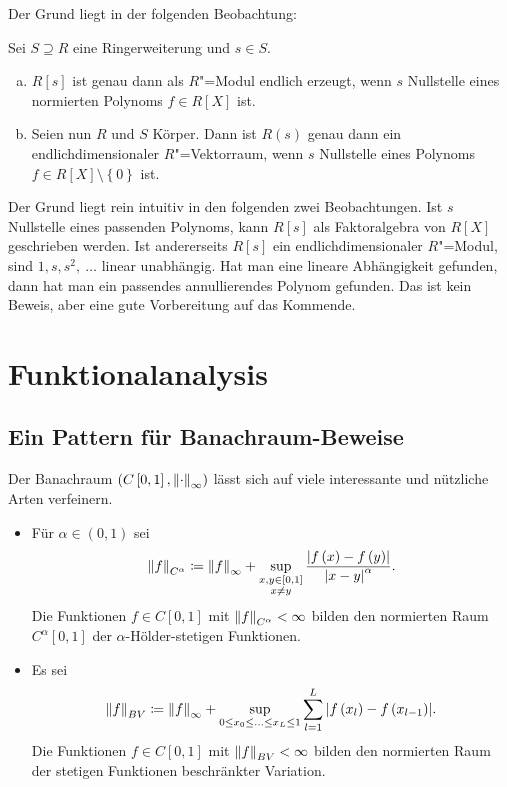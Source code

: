 \documentclass[ngerman, 11pt, a4paper, twoside, abstracton]{scrbook}
\begin{document}
Der Grund liegt in der folgenden Beobachtung:

\begin{pattern}
  Sei $S\supseteq R$ eine Ringerweiterung und $s\in S$.

  \begin{enumerate}[(a)]
    \item $R\left[ s \right]$ ist genau dann als $R$"=Modul endlich erzeugt, wenn $s$ Nullstelle eines normierten Polynoms $f\in R\left[ X \right]$ ist.
    \item Seien nun $R$ und $S$ Körper. Dann ist $R\left( s \right)$ genau dann ein endlichdimensionaler $R$"=Vektorraum, wenn $s$ Nullstelle eines Polynoms $f\in R\left[ X \right]\setminus\left\{ 0 \right\}$ ist.
  \end{enumerate}

\end{pattern}

Der Grund liegt rein intuitiv in den folgenden zwei Beobachtungen. Ist $s$ Nullstelle eines passenden Polynoms, kann $R\left[ s \right]$ als Faktoralgebra von $R\left[ X \right]$ geschrieben werden. Ist andererseits $R\left[ s \right]$ ein endlichdimensionaler $R$"=Modul, sind $1, s, s^2,\ \dots$ linear unabhängig. Hat man eine lineare Abhängigkeit gefunden, dann hat man ein passendes annullierendes Polynom gefunden. Das ist kein Beweis, aber eine gute Vorbereitung auf das Kommende.

\chapter{Funktionalanalysis}

\section{Ein Pattern für Banachraum-Beweise}

\newcommand{\inorm}[1]{\norm{#1}_\infty}

Der Banachraum $\left(C\left[ 0, 1 \right], \inorm{\cdot}\right)$ lässt sich auf viele interessante und nützliche Arten verfeinern.

\begin{itemize}
  \item Für $\alpha\in\left( 0, 1 \right)$ sei
    \[
      \norm{f}_{C^\alpha} \coloneqq \inorm{f} + \sup_{\substack{x, y\in \left[ 0, 1 \right] \\ x \ne y}} \frac{\abs{f\left( x \right) - f\left( y \right)}}{\abs{x-y}^\alpha}.
    \]
    Die Funktionen $f\in C\left[ 0, 1 \right]$ mit $\norm{f}_{C^\alpha}<\infty$ bilden den normierten Raum $C^\alpha\left[ 0, 1 \right]$ der $\alpha$-Hölder-stetigen Funktionen.
  \item Es sei
    \[
      \norm{f}_{BV} \coloneqq \inorm{f} + \sup_{0\le x_0 \le \ldots \le x_L \le 1} \sum_{l=1}^L \abs{f\left( x_l \right) - f\left( x_{l-1} \right)}.
    \]
    Die Funktionen $f\in C\left[ 0, 1 \right]$ mit $\norm{f}_{BV}<\infty$ bilden den normierten Raum der stetigen Funktionen beschränkter Variation.
\end{itemize}
\end{document}
